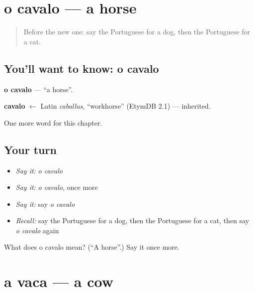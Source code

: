 \section[o cavalo]{o cavalo — a horse}

\label{lesson:PT-C60-cavalo}



\begin{quote}
Before the new one: say the Portuguese for a dog, then the Portuguese for a cat.
\end{quote}

\subsection*{You'll want to know: o cavalo}
\textbf{o cavalo} — \textquotedblleft{}a horse\textquotedblright{}.

\begin{cousinweb}
\textbf{cavalo} $\leftarrow$ Latin \emph{caballus}, \textquotedblleft{}workhorse\textquotedblright{} (EtymDB 2.1) — inherited.
\end{cousinweb}

\begin{grammarlens}[title={What you've built}]
One more word for this chapter.
\end{grammarlens}

\subsection*{Your turn}
\begin{itemize}
\raggedright
  \item \emph{Say it:} \emph{o cavalo}
  \item \emph{Say it:} \emph{o cavalo}, once more
  \item \emph{Say it:} say \emph{o cavalo}
  \item \emph{Recall:} say the Portuguese for a dog, then the Portuguese for a cat, then say \emph{o cavalo} again
\end{itemize}

\begin{tcolorbox}[breakable,colback=teal!4,colframe=teal!35!black,title={Before you move on}]
What does o cavalo mean? (\textquotedblleft{}A horse\textquotedblright{}.) Say it once more.
\end{tcolorbox}
\section[a vaca]{a vaca — a cow}

